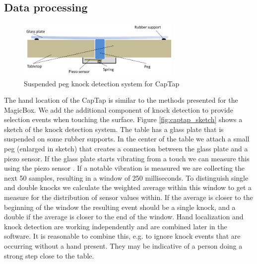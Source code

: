 \subsection{Data processing}
\begin{figure}[h]
\centering
\includegraphics[width=0.7\textwidth]{images/captap_peg}
\caption{Suspended peg knock detection system for CapTap \cite{Braun2013ChairAid}}
\label{fig:captap_peg}
\end{figure}
The hand location of the CapTap is similar to the methods presented for the MagicBox. We add the additional component of knock detection to provide selection events when touching the surface. Figure \ref{fig:captap_sketch} shows a sketch of the knock detection system. The table has a glass plate that is suspended on some rubber supports. In the center of the table we attach a small peg (enlarged in sketch) that creates a connection between the glass plate and a piezo sensor. If the glass plate starts vibrating from a touch we can measure this using the piezo sensor \cite{Braun2013ChairAid}. If a notable vibration is measured we are collecting the next 50 samples, resulting in a window of 250 milliseconds. To distinguish single and double knocks we calculate the weighted average within this window to get a measure for the distribution of sensor values within. If the average is closer to the beginning of the window the resulting event should be a single knock, and a double if the average is closer to the end of the window.
Hand localization and knock detection are working independently and are combined later in the software. It is reasonable to combine this, e.g. to ignore knock events that are occurring without a hand present. They may be indicative of a person doing a strong step close to the table.
